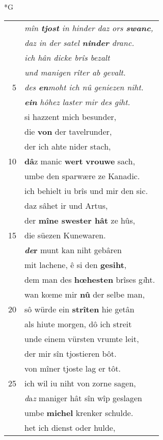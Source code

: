 \documentclass[8pt,a4paper,notitlepage]{article}
\begin{document}
\begin{table}[ht]
\begin{minipage}[t]{0.5\linewidth}
\small
\begin{center}*G
\end{center}
\begin{tabular}{rl}
 & \textit{mîn \textbf{tjost} in hinder daz ors \textbf{swanc},}\\ 
 & \textit{daz in der satel \textbf{ninder} dranc.}\\ 
 & \textit{ich hân dicke brîs bezalt}\\ 
 & \textit{und manigen rîter ab gevalt.}\\ 
5 & \textit{des \textbf{en}moht ich nû geniezen niht.}\\ 
 & \textit{\textbf{ein} hôhez laster mir des giht.}\\ 
 & si hazzent mich besunder,\\ 
 & die \textbf{von} der tavelrunder,\\ 
 & der ich ahte nider stach,\\ 
10 & \textbf{dâ}z manic \textbf{wert} \textbf{vrouwe} sach,\\ 
 & umbe den sparwære ze Kanadic.\\ 
 & ich behielt iu brîs und mir den sic.\\ 
 & daz sâhet ir und Artus,\\ 
 & der \textbf{mîne swester hât} ze hûs,\\ 
15 & die süezen Kunewaren.\\ 
 & \textbf{\textit{de}r} munt kan niht gebâren\\ 
 & mit lachene, ê si den \textbf{gesiht},\\ 
 & dem man des \textbf{hœhesten} brîses g\textit{i}ht.\\ 
 & wan kœme mir \textbf{nû} der selbe man,\\ 
20 & sô würde ein \textbf{strîten} hie getân\\ 
 & als hiute morgen, dô ich streit\\ 
 & unde einem vürsten vrumte leit,\\ 
 & der mir sîn tjostieren bôt.\\ 
 & von mîner tjoste lag er tôt.\\ 
25 & ich wil iu niht von zorne sagen,\\ 
 & \textit{d}a\textit{z} maniger hât sîn wîp geslagen\\ 
 & umbe \textbf{michel} krenker schulde.\\ 
 & het ich dienst oder hulde,\\ 

\end{tabular}
\end{minipage}
\end{table}
\end{document}
